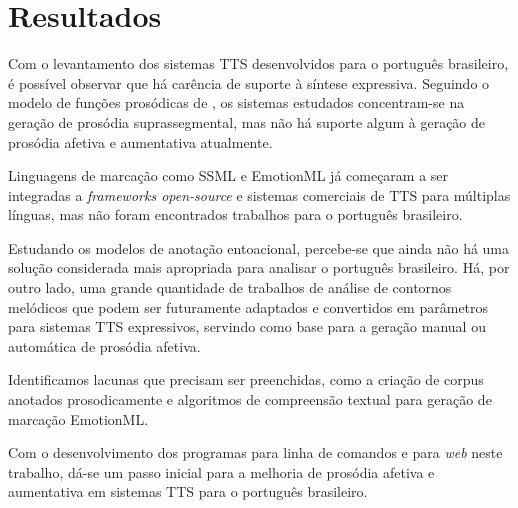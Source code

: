 
\chapter{Resultados}
Com o levantamento dos sistemas TTS desenvolvidos para o português brasileiro, é
possível observar que há carência de suporte à síntese expressiva. Seguindo o
modelo de funções prosódicas de , os sistemas estudados
concentram-se na geração de prosódia suprassegmental, mas não há suporte algum à
geração de prosódia afetiva e aumentativa atualmente.

Linguagens de marcação como SSML e EmotionML já começaram a ser integradas a
\emph{frameworks open-source} e sistemas comerciais de TTS para múltiplas
línguas, mas não foram encontrados trabalhos para o português brasileiro.

Estudando os modelos de anotação entoacional, percebe-se que ainda não há uma
solução considerada mais apropriada para analisar o português brasileiro. Há,
por outro lado, uma grande quantidade de trabalhos de análise de contornos
melódicos que podem ser futuramente adaptados e convertidos em parâmetros para
sistemas TTS expressivos, servindo como base para a geração manual ou automática
de prosódia afetiva.

Identificamos lacunas que precisam ser preenchidas, como a criação de corpus
anotados prosodicamente e algoritmos de compreensão textual para geração de
marcação EmotionML.

Com o desenvolvimento dos programas para linha de comandos e para \emph{web}
neste trabalho, dá-se um passo inicial para a melhoria de prosódia afetiva e
aumentativa em sistemas TTS para o português brasileiro.
